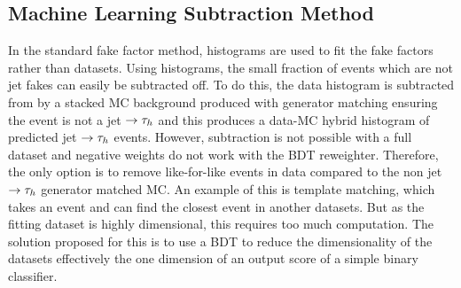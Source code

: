 \subsection{Machine Learning Subtraction Method}

In the standard fake factor method, histograms are used to fit the fake factors rather than datasets. 
Using histograms, the small fraction of events which are not jet fakes can easily be subtracted off. 
To do this, the data histogram is subtracted from by a stacked MC background produced with generator matching ensuring the event is not a jet $\rightarrow\tau_{h}$ and this produces a data-MC hybrid histogram of predicted jet $\rightarrow\tau_{h}$ events.
However, subtraction is not possible with a full dataset and negative weights do not work with the BDT reweighter. 
Therefore, the only option is to remove like-for-like events in data compared to the non jet $\rightarrow\tau_{h}$ generator matched MC.
An example of this is template matching, which takes an event and can find the closest event in another datasets.
But as the fitting dataset is highly dimensional, this requires too much computation.
The solution proposed for this is to use a BDT to reduce the dimensionality of the datasets effectively the one dimension of an output score of a simple binary classifier. \\

